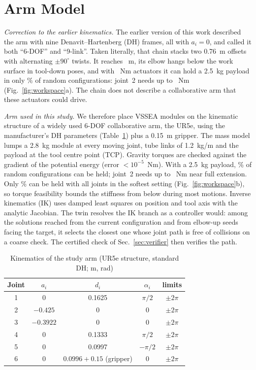 \documentclass[journal]{IEEEtran}
\begin{document}
\section{Arm Model}\label{sec:arm}
\emph{Correction to the earlier kinematics.} The earlier version of this work described the arm with nine Denavit--Hartenberg (DH) frames, all with $a_i=0$, and called it both ``6-DOF'' and ``9-link''. Taken literally, that chain stacks two \SI{0.76}{m} offsets with alternating $\pm90^\circ$ twists. It reaches \reachOrig~m, its elbow hangs below the work surface in tool-down poses, and with \tauMone~Nm actuators it can hold a \SI{2.5}{kg} payload in only \feasOrigPct\% of random configurations: joint~2 needs up to \maxTauOrig~Nm (Fig.~\ref{fig:workspace}a). The chain does not describe a collaborative arm that these actuators could drive.

\emph{Arm used in this study.} We therefore place VSSEA modules on the kinematic structure of a widely used 6-DOF collaborative arm, the UR5e, using the manufacturer's DH parameters (Table~\ref{tab:dh}) plus a \SI{0.15}{m} gripper. The mass model lumps a \SI{2.8}{kg} module at every moving joint, tube links of \SI{1.2}{kg/m} and the payload at the tool centre point (TCP). Gravity torques are checked against the gradient of the potential energy (error $<10^{-5}$~Nm). With a \SI{2.5}{kg} payload, \feasStudyPct\% of random configurations can be held; joint~2 needs up to \maxTauStudy~Nm near full extension. Only \softOkStudyPct\% can be held with all joints in the softest setting (Fig.~\ref{fig:workspace}b), so torque feasibility bounds the stiffness from below during most motions. Inverse kinematics (IK) uses damped least squares \cite{wampler1986} on position and tool axis with the analytic Jacobian. The twin resolves the IK branch as a controller would: among the solutions reached from the current configuration and from elbow-up seeds facing the target, it selects the closest one whose joint path is free of collisions on a coarse check. The certified check of Sec.~\ref{sec:verifier} then verifies the path.

\begin{table}[t]
\caption{Kinematics of the study arm (UR5e structure, standard DH; m, rad)}\label{tab:dh}
\centering\footnotesize
\begin{tabular}{ccccc}
\toprule
Joint & $a_i$ & $d_i$ & $\alpha_i$ & limits\\
\midrule
1 & 0 & 0.1625 & $\pi/2$ & $\pm2\pi$\\
2 & $-0.425$ & 0 & 0 & $\pm2\pi$\\
3 & $-0.3922$ & 0 & 0 & $\pm2\pi$\\
4 & 0 & 0.1333 & $\pi/2$ & $\pm2\pi$\\
5 & 0 & 0.0997 & $-\pi/2$ & $\pm2\pi$\\
6 & 0 & $0.0996+0.15$ (gripper) & 0 & $\pm2\pi$\\
\bottomrule
\end{tabular}
\end{table}
\end{document}
